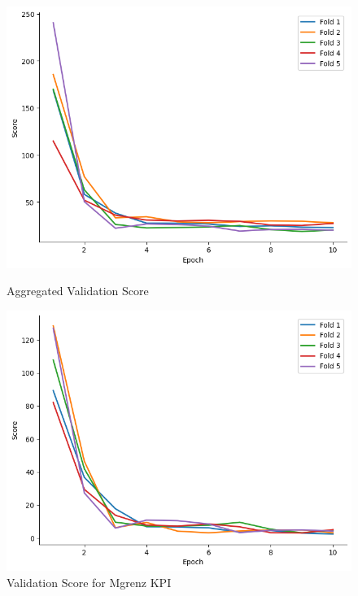 \documentclass{report} %
\begin{document}
\begin{figure}[H]
    \centering
    \begin{minipage}[b]{0.325\textwidth}
        \includegraphics[width=\textwidth]{./ReportImages/val_score.png}
        \caption{\centering Aggregated Validation Score}
        \label{fig:Aggregated Validation Score}
    \end{minipage}
    \begin{minipage}[b]{0.325\textwidth}
        \includegraphics[width=\textwidth]{./ReportImages/val_score_y1.png}
        \caption{\centering Validation Score for Mgrenz \ac{KPI}}
        \label{fig:Validation Score for Torque Curve}
    \end{minipage}

\end{figure}
\end{document}
